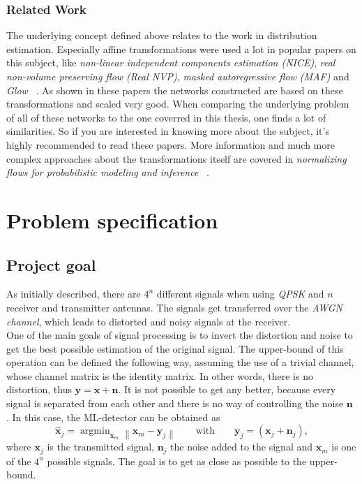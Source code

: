 \documentclass[oneside]{msvreport}%
\DeclareMathOperator*{\argmin}{argmin}
\newcommand{\norm}[1]{\left\lVert#1\right\rVert}
\newcommand{\B}[1]{\boldsymbol{#1}}
\newcommand{\Bhat}[1]{\boldsymbol{\hat{#1}}}
\newcommand{\e}[1]{\emph{#1}}
\begin{document}
\subsection{Related Work}
The underlying concept defined above relates to the work in distribution estimation. Especially affine transformations were used a lot in popular papers on this subject, like \emph{non-linear independent components estimation (NICE)}, \textit{real non-volume preserving flow (Real NVP)}, \emph{masked autoregressive flow (MAF)} and \emph{Glow} ~\cite{DBLP:journals/corr/DinhSB16, dinh2014nice, DBLP:journals/corr/KingmaSW16, papamakarios2017masked}. As shown in these papers the networks constructed are based on these transformations and scaled very good. When comparing the underlying problem of all of these networks to the one coverred in this thesis, one finds a lot of similarities. So if you are interested in knowing more about the subject, it's highly recommended to read these papers. More information and much more complex approaches about the transformations itself are covered in \emph{normalizing flows for probabilistic modeling and inference} ~\cite{papamakarios2019normalizing}.

\chapter{Problem specification}
\section{Project goal}
As initially described, there are $4^n$ different signals when using \e{QPSK} and $n$ receiver and transmitter antennas. The signals get transferred over the \e{AWGN channel}, which leads to distorted and noisy signals at the receiver. \\One of the main goals of signal processing is to invert the distortion and noise to get the best possible estimation of the original signal. The upper-bound of this operation can be defined the following way, assuming the use of a trivial channel, whose channel matrix is the identity matrix. In other words, there is no distortion, thus $\B{y} = \B{x} + \B{n}$. It is not possible to get any better, because every signal is separated from each other and there is no way of controlling the noise $\B{n}$ . In this case, the ML-detector can be obtained as
\begin{equation}
\Bhat{x}_j = \argmin_{\B{x}_m} \norm{\B{x}_m - \B{y}_j} \qquad \text{with} \qquad \B{y}_j = (\B{x}_j + \B{n}_j),
\end{equation}
where $\B{x}_j$ is the transmitted signal, $\B{n}_j$ the noise added to the signal and $\B{x}_m$ is one of the $4^n$ possible signals. The goal is to get as close as possible to the upper-bound.
\end{document}
